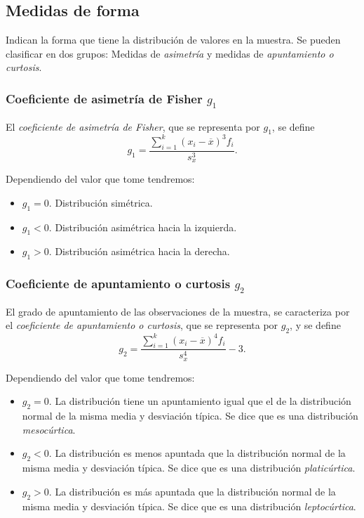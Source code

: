 \subsection{Medidas de forma}
Indican la forma que tiene la distribución de valores en la muestra.
Se pueden clasificar en dos grupos: Medidas de \emph{asimetría} y medidas de \emph{apuntamiento o curtosis}.

\subsubsection{Coeficiente de asimetría de Fisher $\textit{g}_\textit{1}$}
El \emph{coeficiente de asimetría de Fisher}, que se representa por $g_1$, se define
\[
g_1=\frac{\sum_{i=1}^{k}(x_i-\overline{x})^{3}f_i}{s_x^{3}}.
\]

Dependiendo del valor que tome tendremos:
\begin{itemize}
\item $g_1=0$. Distribución simétrica.
\item $g_1<0$. Distribución asimétrica hacia la izquierda.
\item $g_1>0$. Distribución asimétrica hacia la derecha.
\end{itemize}

\subsubsection{Coeficiente de apuntamiento o curtosis $\textit{g}_\textit{2}$}
El grado de apuntamiento de las observaciones de la muestra, se caracteriza por el \emph{coeficiente de apuntamiento o
curtosis}, que se representa por $g_2$, y se define
\[
g_2=\frac{\sum_{i=1}^{k}(x_i-\overline{x})^{4}f_i}{s_x^{4}}-3.
\]

Dependiendo del valor que tome tendremos:
\begin{itemize}
\item $g_2=0$. La distribución tiene un apuntamiento igual que el de la distribución normal de la misma media y
desviación típica. Se dice que es una distribución \emph{mesocúrtica}.
\item $g_2<0$. La distribución es menos apuntada que la distribución normal de la misma media y desviación típica. Se
dice que es una distribución \emph{platicúrtica}.
\item $g_2>0$. La distribución es más apuntada que la distribución normal de la misma media y desviación típica. Se dice
que es una distribución \emph{leptocúrtica}.
\end{itemize}

